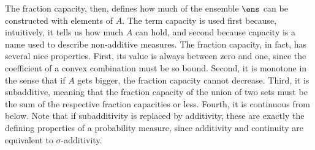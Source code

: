 The fraction capacity, then, defines how much of the ensemble $\ens$ can be constructed with elements of $A$. The term capacity is used first because, intuitively, it tells us how much $A$ can hold, and second because capacity is a name used to describe non-additive measures. The fraction capacity, in fact, has several nice properties. First, its value is always between zero and one, since the coefficient of a convex combination must be so bound. Second, it is monotone in the sense that if $A$ gets bigger, the fraction capacity cannot decrease. Third, it is subadditive, meaning that the fraction capacity of the union of two sets must be the sum of the respective fraction capacities or less. Fourth, it is continuous from below. Note that if subadditivity is replaced by additivity, these are exactly the defining properties of a probability measure, since additivity and continuity are equivalent to $\sigma$-additivity.

